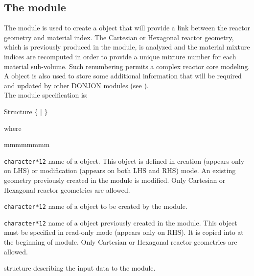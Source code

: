 \subsection{The  module}\label{sect:link}

\vskip 0.2cm
The  module is used to create a  object that will provide
a link between the reactor geometry and material index. The  Cartesian or
 Hexagonal reactor geometry, which is previously produced in the 
module, is analyzed and the material mixture indices are recomputed in order to provide
a unique mixture number for each material sub-volume. Such renumbering permits a complex reactor
core modeling. A  object is also used to store some additional information
that will be required and updated by other DONJON modules (see ).\\

\noindent
The  module specification is: 

\begin{DataStructure}{Structure }
  \moc{:=} 
$\{$  $|$  $\}$ \moc{::} 
\end{DataStructure}

\noindent where
\begin{ListeDeDescription}{mmmmmmmm}

\item[\dusa{GEOM}] \texttt{character*12} name of a  object. This object is defined
in creation (appears only on LHS) or modification (appears on both LHS and RHS) mode. An existing geometry previously created in
the  module is modified. Only  Cartesian or  Hexagonal reactor geometries are allowed.

\item[\dusa{MATEX}] \texttt{character*12} name of a  object
to be created by the module.

\item[\dusa{GEOMOLD}] \texttt{character*12} name of a  object previously created in the  module.
This object must be specified in read-only mode (appears only on RHS). It is copied into  at the beginning of  module.
Only  Cartesian or  Hexagonal reactor geometries are allowed.

\item[\dstr{desclink}] structure describing the input data to the  module.

\end{ListeDeDescription}

